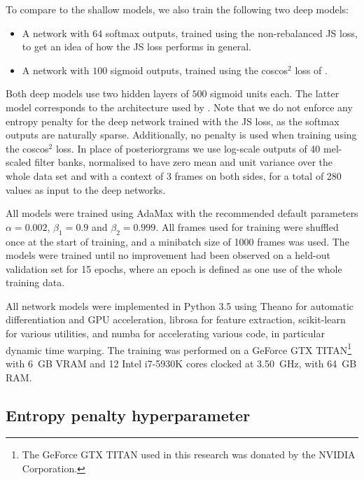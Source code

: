 To compare to the shallow models, we also train the following two deep models:
\begin{itemize}
 \item A network with $64$ softmax outputs, trained using the non-rebalanced JS loss, to get an idea of how the JS loss performs in general.
 \item A network with $100$ sigmoid outputs, trained using the coscos$^2$ loss of \textcite{synnaeve2014phonetics}.
\end{itemize}
Both deep models use two hidden layers of $500$ sigmoid units each.
The latter model corresponds to the architecture used by \textcite{thiolliere2015hybrid}.
Note that we do not enforce any entropy penalty for the deep network trained with the JS loss, as the softmax outputs are naturally sparse.
Additionally, no penalty is used when training using the coscos$^2$ loss.
In place of posteriorgrams we use log-scale outputs of 40 mel-scaled filter banks, normalised to have zero mean and unit variance over the whole data set and with a context of 3 frames on both sides, for a total of 280 values as input to the deep networks.

All models were trained using AdaMax \parencite{kingma2014adam} with the recommended default parameters $\alpha = 0.002$, $\beta_1 = 0.9$ and $\beta_2 = 0.999$.
All frames used for training were shuffled once at the start of training, and a minibatch size of 1000 frames was used.
The models were trained until no improvement had been observed on a held-out validation set for 15 epochs, where an epoch is defined as one use of the whole training data.

All network models were implemented in Python 3.5 using Theano \parencite{theano} for automatic differentiation and GPU acceleration, librosa \parencite{librosa} for feature extraction, scikit-learn \parencite{scikit-learn} for various utilities, and numba \parencite{numba} for accelerating various code, in particular dynamic time warping.
The training was performed on a GeForce GTX TITAN\footnote{The GeForce GTX TITAN used in this research was donated by the NVIDIA Corporation.} with 6~GB VRAM and 12 Intel i7-5930K cores clocked at 3.50~GHz, with 64~GB RAM.

\subsection{Entropy penalty hyperparameter}
\label{sec:tune-entropy}

